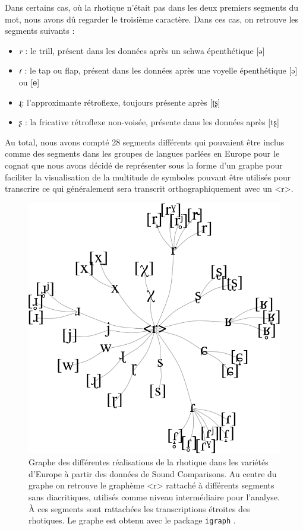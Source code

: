 Dans certains cas, où la rhotique n'était pas dans les deux premiers segments du mot, nous avons dû regarder le troisième caractère. Dans ces cas, on retrouve les segments suivants : 

\begin{itemize}
	\item \textit{r} : le trill, présent dans les données après un schwa épenthétique [ə]
	\item \textit{ɾ} : le tap ou flap, présent dans les données après une voyelle épenthétique [ə] ou [ɵ]
	\item {ɻ}: l'approximante rétroflexe, toujours présente après [ʈʂ]
	\item \textit{ʂ} : la fricative rétroflexe non-voisée, présente dans les données après [tʂ]
\end{itemize}

Au total, nous avons compté 28 segments différents qui pouvaient être inclus comme des segments  dans les groupes de langues parlées en Europe pour le cognat  que nous avons décidé de représenter sous la forme d'un graphe pour faciliter la visualisation de la multitude de symboles pouvant être utilisés pour transcrire ce qui généralement sera transcrit orthographiquement avec un <r>.\\

\begin{figure}
	\centering
	\includegraphics[width=0.7\linewidth]{substance/images/europe_three1CROP}
	\caption[Graphe des différentes réalisations de la rhotique dans les variétés d'Europe]{Graphe des différentes réalisations de la rhotique dans les variétés d'Europe à partir des données de Sound Comparisons. Au centre du graphe on retrouve le graphème <r> rattaché à différents segments  sans diacritiques, utilisés comme niveau intermédiaire pour l'analyse. À ces segments sont rattachées les transcriptions étroites des rhotiques. Le graphe est obtenu avec le package \texttt{igraph} \parencite{csardiIgraphSoftwarePackage2006}.}
	\label{fig:europethree}
\end{figure}


